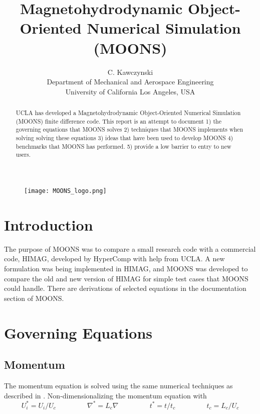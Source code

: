 \documentclass[11pt]{article}
\newcommand{\eqtab}{\;\;\;\;\;\;\;\;\;\;\;\;\;\;\;\;}
\begin{document}
\doublespacing
\begin{figure}
\centering
\texttt{[image: MOONS\_logo.png]}
\end{figure}
\title{Magnetohydrodynamic Object-Oriented Numerical Simulation (MOONS)}
\author{C. Kawczynski \\
Department of Mechanical and Aerospace Engineering \\
University of California Los Angeles, USA\\
}
\maketitle

\begin{abstract}
UCLA has developed a Magnetohydrodynamic Object-Oriented Numerical Simulation (MOONS) finite difference code. This report is an attempt to document 1) the governing equations that MOONS solves 2) techniques that MOONS implements when solving solving these equations 3) ideas that have been used to develop MOONS 4) benchmarks that MOONS has performed. 5) provide a low barrier to entry to new users.
\end{abstract}

\section{Introduction}
The purpose of MOONS was to compare a small research code with a commercial code, HIMAG, developed by HyperComp with help from UCLA. A new formulation was being implemented in HIMAG, and MOONS was developed to compare the old and new version of HIMAG for simple test cases that MOONS could handle. There are derivations of selected equations in the documentation section of MOONS.

\section{Governing Equations}

\subsection{Momentum}
The momentum equation is solved using the same numerical techniques as described in \cite{griebel1997numerical}.
Non-dimensionalizing the momentum equation with
\begin{equation*}
U_i^* = U_i/U_c  \eqtab
\nabla^* = L_c \nabla \eqtab
t^* = t/t_c  \eqtab
t_c = L_c/U_c
\end{equation*}
\end{document}
